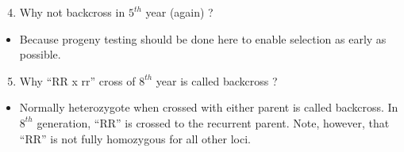 \documentclass[11pt,ignorenonframetext,aspectratio=169]{beamer}
\newif\ifbibliography
\providecommand{\tightlist}{%
  \setlength{\itemsep}{0pt}\setlength{\parskip}{0pt}}
\begin{document}
\begin{frame}
\begin{enumerate}
\setcounter{enumi}{3}
\tightlist
\item
  Why not backcross in \(5^{th}\) year (again) ?
\end{enumerate}

\begin{itemize}
\tightlist
\item
  Because progeny testing should be done here to enable selection as
  early as possible.
\end{itemize}

\begin{enumerate}
\setcounter{enumi}{4}
\tightlist
\item
  Why ``RR x rr'' cross of \(8^{th}\) year is called backcross ?
\end{enumerate}

\begin{itemize}
\tightlist
\item
  Normally heterozygote when crossed with either parent is called
  backcross. In \(8^{th}\) generation, ``RR'' is crossed to the
  recurrent parent. Note, however, that ``RR'' is not fully homozygous
  for all other loci.
\end{itemize}
\end{frame}

          \begin{frame}[allowframebreaks]{}
    \bibliographytrue
    
    \end{frame}
  
\end{document}
